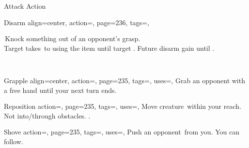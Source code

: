 \begin{PageBackLandscape}
\begin{TablesHalf}{\backTableHeight}
\begin{Table}{Attack Action}
            \begin{entry}{Disarm}{%
                align=center,
                action=,
                page=236,
                tags=\Attack,
            }
                \begin{minipage}{0.8\linewidth}
                    \AthleticsReflex[tags={T}] \dash\,Knock something out of an opponent's grasp.\\
                    Target takes \,\Cirm to using the item until target . Future disarm gain  \Cirm until .
                \end{minipage}\hfill
                \begin{minipage}{0.2\linewidth}
                    \raggedleft
                    \\
                \end{minipage}
            \end{entry}
            \begin{entry}{Grapple}{%
                align=center,
                action=,
                page=235,
                tags=\Attack,
                uses=\AthleticsFortitude,
            }
                Grab an opponent with a free hand until your next turn ends. \hfill{}\\
                \hspace{10.5ex}\hfill
            \end{entry}
            \begin{entry}{Reposition}{%
                action=,
                page=235,
                tags=\Attack,
                uses=\AthleticsFortitude,
            }
                Move creature \,\Feet within your reach. Not into/through obstacles.\hfill
                .
            \end{entry}
            \begin{entry}{Shove}{%
                action=,
                page=235,
                tags=\Attack,
                uses=\AthleticsFortitude,
            }
                Push an opponent \,\Feet from you. You can follow. \hfill

\end{entry}
\end{Table}
\end{TablesHalf}
\end{PageBackLandscape}
